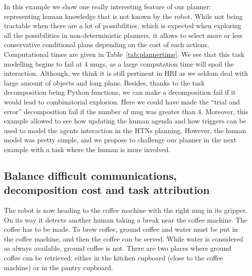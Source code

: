 \documentclass[a4paper,11pt,twoside]{StyleThese}
\begin{document}
In this example we show one really interesting feature of our planner: representing human knowledge that is not known by the robot. While not being tractable when there are a lot of possibilities, which is expected when exploring all the possibilities in non-deterministic planners, it allows to select more or less conservative conditional plans depending on the cost of each actions. Computational times are given in Table~\ref{tab:plannertime}. We see that this task modelling begins to fail at 4 mugs, as a large computation time will spoil the interaction. Although, we think it is still pertinent in HRI as we seldom deal with large amount of objects and long plans. Besides, thanks to the task decomposition being Python functions, we can make a decomposition fail if it would lead to combinatorial explosion. Here we could have made the ``trial and error'' decomposition fail if the number of mug was greater than 4. Moreover, this example allowed to see how updating the human agenda and how triggers can be used to model the agents interaction in the HTNs planning.
However, the human model was pretty simple, and we propose to challenge our planner in the next example with a task where the human is more involved.

\subsection{Balance difficult communications, decomposition cost and task attribution}
The robot is now heading to the coffee machine with the right mug in its gripper. On its way it detects another human taking a break near the coffee machine. The coffee has to be made. To brew coffee, ground coffee and water must be put in the coffee machine, and then the coffee can be served. While water is considered as always available, ground coffee is not. There are two places where ground coffee can be retrieved: either in the kitchen cupboard (close to the coffee machine) or in the pantry cupboard. 
\end{document}
